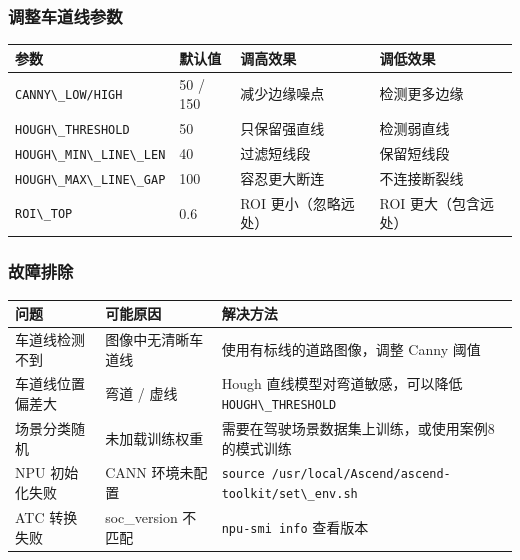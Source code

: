 \subsubsection{调整车道线参数}\label{src-experiment-case6-h25}

\begin{longtable}[]{@{}llll@{}}
\toprule\noalign{}
参数 & 默认值 & 调高效果 & 调低效果 \\
\midrule\noalign{}
\endhead
\bottomrule\noalign{}
\endlastfoot
\passthrough{\lstinline!CANNY\_LOW/HIGH!} & 50 / 150 & 减少边缘噪点 &
检测更多边缘 \\
\passthrough{\lstinline!HOUGH\_THRESHOLD!} & 50 & 只保留强直线 &
检测弱直线 \\
\passthrough{\lstinline!HOUGH\_MIN\_LINE\_LEN!} & 40 & 过滤短线段 &
保留短线段 \\
\passthrough{\lstinline!HOUGH\_MAX\_LINE\_GAP!} & 100 & 容忍更大断连 &
不连接断裂线 \\
\passthrough{\lstinline!ROI\_TOP!} & 0.6 & ROI 更小（忽略远处） & ROI
更大（包含远处） \\
\end{longtable}

\subsubsection{故障排除}\label{src-experiment-case6-h26}

\begin{longtable}[]{@{}
  >{\raggedright\arraybackslash}p{}
  >{\raggedright\arraybackslash}p{}
  >{\raggedright\arraybackslash}p{}@{}}
\toprule\noalign{}
\begin{minipage}[b]{\linewidth}\raggedright
问题
\end{minipage} & \begin{minipage}[b]{\linewidth}\raggedright
可能原因
\end{minipage} & \begin{minipage}[b]{\linewidth}\raggedright
解决方法
\end{minipage} \\
\midrule\noalign{}
\endhead
\bottomrule\noalign{}
\endlastfoot
车道线检测不到 & 图像中无清晰车道线 & 使用有标线的道路图像，调整 Canny
阈值 \\
车道线位置偏差大 & 弯道 / 虚线 & Hough 直线模型对弯道敏感，可以降低
\passthrough{\lstinline!HOUGH\_THRESHOLD!} \\
场景分类随机 & 未加载训练权重 &
需要在驾驶场景数据集上训练，或使用案例8的模式训练 \\
NPU 初始化失败 & CANN 环境未配置 &
\passthrough{\lstinline!source /usr/local/Ascend/ascend-toolkit/set\_env.sh!} \\
ATC 转换失败 & soc\_version 不匹配 &
\passthrough{\lstinline!npu-smi info!} 查看版本 \\
\end{longtable}

